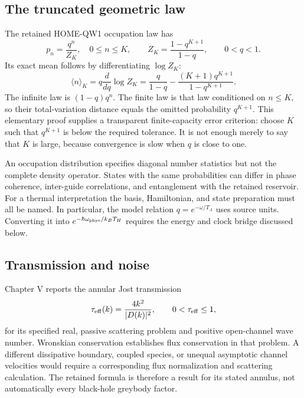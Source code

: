 \subsection{The truncated geometric law}
The retained HOME-QW1 occupation law has
\begin{equation}
 p_n=\frac{q^n}{Z_K},\quad 0\le n\le K,\qquad
 Z_K=\frac{1-q^{K+1}}{1-q},\qquad 0<q<1.
 \label{c7:geometric}
\end{equation}
Its exact mean follows by differentiating $\log Z_K$:
\begin{equation}
 \langle n\rangle_K=q\frac{d}{dq}\log Z_K
 =\frac{q}{1-q}-\frac{(K+1)q^{K+1}}{1-q^{K+1}}.
 \label{c7:mean}
\end{equation}
The infinite law is $(1-q)q^n$. The finite law is that law conditioned on $n\le K$, so their total-variation distance equals the omitted probability $q^{K+1}$. This elementary proof supplies a transparent finite-capacity error criterion: choose $K$ such that $q^{K+1}$ is below the required tolerance. It is not enough merely to say that $K$ is large, because convergence is slow when $q$ is close to one.

An occupation distribution specifies diagonal number statistics but not the complete density operator. States with the same probabilities can differ in phase coherence, inter-guide correlations, and entanglement with the retained reservoir. For a thermal interpretation the basis, Hamiltonian, and state preparation must all be named. In particular, the model relation $q=e^{-\omega/T_A}$ uses source units. Converting it into $e^{-\hbar\omega_{\rm phys}/k_BT_H}$ requires the energy and clock bridge discussed below.

\subsection{Transmission and noise}
Chapter V reports the annular Jost transmission
\begin{equation}
 \tau_{\rm eff}(k)=\frac{4k^2}{|D(k)|^2},\qquad
 0<\tau_{\rm eff}\le1,
 \label{c7:jost}
\end{equation}
for its specified real, passive scattering problem and positive open-channel wave number. Wronskian conservation establishes flux conservation in that problem. A different dissipative boundary, coupled species, or unequal asymptotic channel velocities would require a corresponding flux normalization and scattering calculation. The retained formula is therefore a result for its stated annulus, not automatically every black-hole greybody factor.

